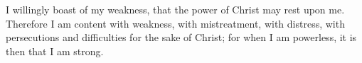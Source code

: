 
\lettrine{I}{} willingly boast of my weakness, that the power of Christ may rest upon me. Therefore I am content with weakness, with mistreatment, with distress, with persecutions and difficulties for the sake of Christ; for when I am powerless, it is then that I am strong.